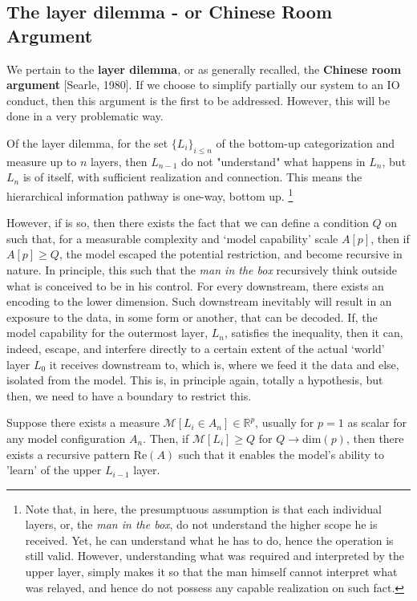 \subsection{The layer dilemma - or Chinese Room Argument}

We pertain to the \textbf{layer dilemma}, or as generally recalled, the \textbf{Chinese room argument} [Searle, 1980]. If we choose to simplify partially our system to an IO conduct, then this argument is the first to be addressed. However, this will be done in a very problematic way. 

\begin{assumption}
Of the layer dilemma, for the set $\{L_i\}_{i\leq n}$ of the bottom-up categorization and measure up to $n$ layers, then $L_{n-1}$ do not "understand" what happens in $L_n$, but $L_n$ is of itself, with sufficient realization and connection. This means the hierarchical information pathway is one-way, bottom up. \footnote{Note that, in here, the presumptuous assumption is that each individual layers, or, the \textit{man in the box}, do not understand the higher scope he is received. Yet, he can understand what he has to do, hence the operation is still valid. However, understanding what was required and interpreted by the upper layer, simply makes it so that the man himself cannot interpret what was relayed, and hence do not possess any capable realization on such fact.}
\end{assumption}

However, if is so, then there exists the fact that we can define a condition $Q$ on such that, for a measurable complexity and `model capability' scale $A[p]$, then if $A[p]\geq Q$, the model escaped the potential restriction, and become recursive in nature. In principle, this such that the \textit{man in the box} recursively think outside what is conceived to be in his control. For every downstream, there exists an encoding to the lower dimension. Such downstream inevitably will result in an exposure to the data, in some form or another, that can be decoded. If, the model capability for the outermost layer, $L_n$, satisfies the inequality, then it can, indeed, escape, and interfere directly to a certain extent of the actual `world' layer $L_0$ it receives downstream to, which is, where we feed it the data and else, isolated from the model. This is, in principle again, totally a hypothesis, but then, we need to have a boundary to restrict this. 

\begin{conjecture}
    Suppose there exists a measure $\mathcal{M}[L_i \in A_n]\in \mathbb{R}^{p}$, usually for $p=1$ as scalar for any model configuration $A_n$. Then, if $\mathcal{M}[L_i]\geq Q$ for $Q\to \mathrm{dim}(p)$, then there exists a recursive pattern $\mathrm{Re}(A)$ such that it enables the model's ability to 'learn' of the upper $L_{i-1}$ layer.
\end{conjecture}

